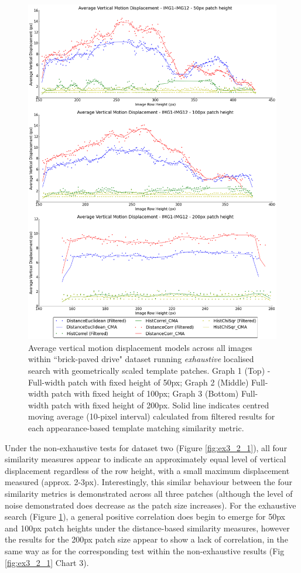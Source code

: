 \clearpage
\begin{figure}[ht!]
\centering
\includegraphics[scale=0.3]{images/results/wiltshire_outside_10cm_scaled_exhaustive}
\caption{Average vertical motion displacement models across all images within ``brick-paved drive" dataset running \textit{exhaustive} localised search with geometrically scaled template patches. Graph 1 (Top) - Full-width patch with fixed height of 50px; Graph 2 (Middle) Full-width patch with fixed height of 100px; Graph 3 (Bottom) Full-width patch with fixed height of 200px. Solid line indicates centred moving average (10-pixel interval) calculated from filtered results for each appearance-based template matching similarity metric.}
\label{fig:ex3_2_2}
\end{figure}

Under the non-exhaustive tests for dataset two (Figure \ref{fig:ex3_2_1}), all four similarity measures appear to indicate an approximately equal level of vertical displacement regardless of the row height, with a small maximum displacement measured (approx. 2-3px). Interestingly, this similar behaviour between the four similarity metrics is demonstrated across all three patches (although the level of noise demonstrated does decrease as the patch size increases). For the exhaustive search (Figure \ref{fig:ex3_2_2}), a general positive correlation does begin to emerge for 50px and 100px patch heights under the distance-based similarity measures, however the results for the 200px patch size appear to show a lack of correlation, in the same way as for the corresponding test within the non-exhaustive results (Fig \ref{fig:ex3_2_1} Chart 3). 

